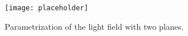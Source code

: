 \begin{figure}
	\centering
	\texttt{[image: placeholder]}
	\caption{Parametrization of the light field with two planes.}
	\label{fig:LightFieldParametrization}
\end{figure}


%	
%	
%		
%	
%		
%		
%	

